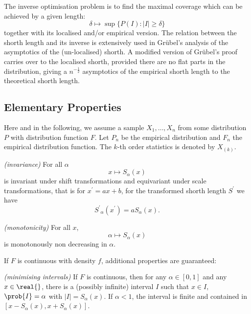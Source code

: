 \documentclass[dvips,12pt,a4paper,twoside]{amsart}
\begin{document}
The inverse optimisation problem is to find the maximal coverage which can be achieved by a given length:
$$
\delta \longmapsto \sup  \{P(I): | I | \geq \delta \}
$$
together with its localised and/or empirical version.
%
The relation between the shorth length and its inverse is extensively used in Gr\"ubel's analysis of the asymptotics  of the (un-localised) shorth. A modified version of Gr\"ubel's proof carries over to the localised shorth, provided there are no flat parts in the distribution, giving a  $n^{-\frac{1}{2}}$ asymptotics of the empirical shorth length to the theoretical shorth length.

\subsection{Elementary Properties}
Here and in the following, we assume a sample $X_1, \ldots, X_n$ from some distribution $P$ with 
distribution function $F$. Let $P_n$ be the empirical distribution and $F_n$ the empirical distribution 
function. The $k$-th order statistics is denoted by $X_{(k)}$.

\begin{rem}\emph{(invariance)}
For all $\alpha$
$$
x \mapsto S_\alpha(x)
$$
is invariant under shift transformations and equivariant under scale transformations, that is for $x^\prime 
= a  x+b$, for the transformed shorth length $S^\prime$ we have
$$
{S^\prime}_{\alpha}(x^\prime) = a  S_\alpha(x).
$$
\end{rem}
%
\begin{rem}\emph{(monotonicity)}\label{rem:monot}
For all $x$, 
$$
\alpha \mapsto S_\alpha(x)
$$
is monotonously non decreasing in $\alpha$.
\end{rem}
%
%

If $F$ is continuous with  density $f$, additional properties are guaranteed:

\begin{rem}\emph{(minimising intervals)}
If $F$ is continuous, then for any $\alpha \in [0, 1]$ and any $x \in \real{}$, there is a (possibly infinite) 
interval $I$ such that $x \in I$, $\prob{I} = \alpha$ with $|I| = S_{\alpha}(x)$. \newline
If $\alpha < 1$, the interval is
finite and contained in $[x-S_{\alpha}(x), x+ S_{\alpha}(x)]$.
\end{rem}
\end{document}
